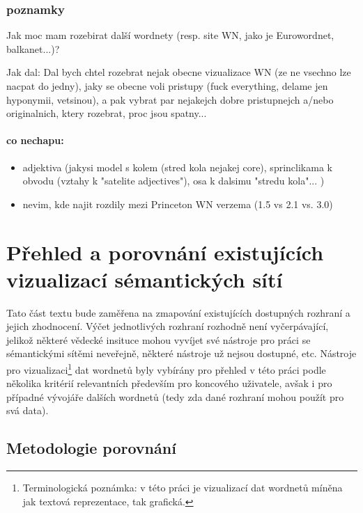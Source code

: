 \documentclass[a4paper, 11pt, oneside]{book}
\begin{document}
				

				\section*{poznamky}

				Jak moc mam rozebirat další wordnety (resp. site WN, jako je Eurowordnet, balkanet...)? 

				Jak dal: Dal bych chtel rozebrat nejak obecne vizualizace WN (ze ne vsechno lze nacpat do jedny), jaky se obecne voli pristupy (fuck everything, delame jen hyponymii, vetsinou), a pak vybrat par nejakejch dobre pristupnejch a/nebo originalnich, ktery rozebrat, proc jsou spatny...

				\subsection*{co nechapu:}

				\begin{itemize}
					\item adjektiva (jakysi model s kolem (stred kola nejakej core), sprinclikama k obvodu (vztahy k "satelite adjectives"), osa k dalsimu "stredu kola"... )
					\item nevim, kde najit rozdily mezi Princeton WN verzema (1.5 vs 2.1 vs. 3.0)
				\end{itemize}

	\part{Přehled a porovnání existujících vizualizací sémantických sítí}

		Tato část textu bude zaměřena na zmapování existujících dostupných rozhraní a jejich zhodnocení. Výčet jednotlivých rozhraní rozhodně není vyčerpávající, jelikož některé vědecké insituce mohou vyvíjet své nástroje pro práci se sémantickými sítěmi neveřejně, některé nástroje už nejsou dostupné, etc. Nástroje pro vizualizaci\footnote{Terminologická poznámka: v této práci je vizualizací dat wordnetů míněna jak textová reprezentace, tak grafická.} dat wordnetů byly vybírány pro přehled v této práci podle několika kritérií relevantních především pro koncového uživatele, avšak i pro případné vývojáře dalších wordnetů (tedy zda dané rozhraní mohou použít pro svá data).

		\chapter{Metodologie porovnání}
\end{document}
